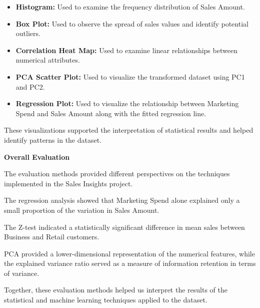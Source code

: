 \documentclass[12pt,a4paper]{report}
\begin{document}
\begin{itemize}

    \item \textbf{Histogram:}
    Used to examine the frequency
    distribution of Sales Amount.

    \item \textbf{Box Plot:}
    Used to observe the spread
    of sales values and identify
    potential outliers.

    \item \textbf{Correlation Heat Map:}
    Used to examine linear
    relationships between
    numerical attributes.

    \item \textbf{PCA Scatter Plot:}
    Used to visualize the
    transformed dataset using
    PC1 and PC2.

    \item \textbf{Regression Plot:}
    Used to visualize the
    relationship between
    Marketing Spend and Sales Amount
    along with the fitted
    regression line.

\end{itemize}

These visualizations supported
the interpretation of statistical
results and helped identify
patterns in the dataset.


\medskip

\noindent\textbf{Overall Evaluation}

The evaluation methods provided
different perspectives on the
techniques implemented in the
Sales Insights project.

The regression analysis showed
that Marketing Spend alone
explained only a small proportion
of the variation in Sales Amount.

The Z-test indicated a statistically
significant difference in mean
sales between Business and
Retail customers.

PCA provided a lower-dimensional
representation of the numerical
features, while the explained
variance ratio served as a
measure of information retention
in terms of variance.

Together, these evaluation
methods helped us interpret
the results of the statistical
and machine learning techniques
applied to the dataset.

\endgroup
\end{document}
